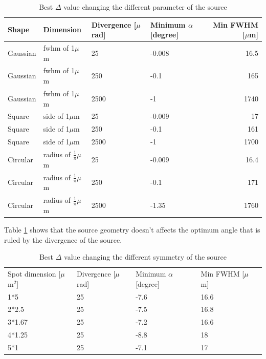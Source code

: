 \documentclass[a4paper]{article}
\begin{document}
\begin{table}[ht]
\centering
\begin{tabular}{l|l|l|l|r}
Shape & Dimension  & Divergence [$\mu$rad] & Minimum $\alpha$ [degree] & Min FWHM [$\mu$m]  \\ %
\hline %
Gaussian & fwhm of 1$\mu$m & 25 & -0.008 & 16.5 \\
Gaussian & fwhm of 1$\mu$m & 250 & -0.1 & 165 \\
Gaussian & fwhm of 1$\mu$m & 2500 & -1 & 1740 \\
Square & side of 1$\mu$m & 25 & -0.009 & 17 \\
Square & side of 1$\mu$m & 250 & -0.1 & 161 \\
Square & side of 1$\mu$m & 2500 & -1 & 1700 \\
Circular & radius of $\frac{1}{\pi}$$\mu$m & 25 & -0.009 & 16.4 \\
Circular & radius of $\frac{1}{\pi}$$\mu$m & 250 & -0.1 & 171 \\
Circular & radius of $\frac{1}{\pi}$$\mu$m & 2500 & -1.35 & 1760 \\


\end{tabular}
\caption{Best $\Delta$ value changing the different parameter of the source}
\label{tab:best_delta}
\end{table}

\medskip

Table \ref{tab:best_delta} shows that the source geometry doesn't affects the optimum angle that is ruled by the divergence of the source.


\begin{table}[ht]
\centering
\begin{tabular}{l|l|l|l|r} Spot dimension [$\mu$m$^2$] & Divergence [$\mu$rad] & Minimum $\alpha$ [degree] & Min FWHM [$\mu$m]\\
1*5 & 25 & -7.6 & 16.6\\
2*2.5 & 25 & -7.5 & 16.8\\
3*1.67 & 25 & -7.2 & 16.6\\
4*1.25 & 25 & -8.8 & 18\\
5*1 & 25 & -7.1 & 17\\

\end{tabular}
\caption{Best $\Delta$ value changing the different symmetry of the source}
\label{tab:best_delta_symmetry}
\end{table}
\end{document}
